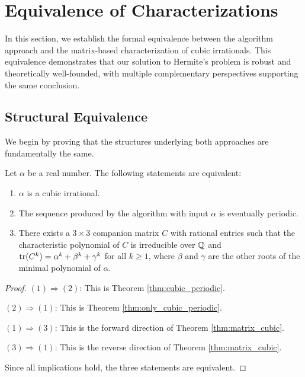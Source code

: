 \section{Equivalence of Characterizations}\label{sec:equivalence}

In this section, we establish the formal equivalence between the \HAPD{} algorithm approach and the matrix-based characterization of cubic irrationals. This equivalence demonstrates that our solution to Hermite's problem is robust and theoretically well-founded, with multiple complementary perspectives supporting the same conclusion.

\subsection{Structural Equivalence}

We begin by proving that the structures underlying both approaches are fundamentally the same.

\begin{theorem}\label{thm:structural_equivalence}
Let $\alpha$ be a real number. The following statements are equivalent:
\begin{enumerate}
    \item $\alpha$ is a cubic irrational.
    \item The sequence produced by the \HAPD{} algorithm with input $\alpha$ is eventually periodic.
    \item There exists a $3 \times 3$ companion matrix $C$ with rational entries such that the characteristic polynomial of $C$ is irreducible over $\mathbb{Q}$ and $\operatorname{tr}(C^k) = \alpha^k + \beta^k + \gamma^k$ for all $k \geq 1$, where $\beta$ and $\gamma$ are the other roots of the minimal polynomial of $\alpha$.
\end{enumerate}
\end{theorem}

\begin{proof}
$(1) \Rightarrow (2)$: This is Theorem \ref{thm:cubic_periodic}.

$(2) \Rightarrow (1)$: This is Theorem \ref{thm:only_cubic_periodic}.

$(1) \Rightarrow (3)$: This is the forward direction of Theorem \ref{thm:matrix_cubic}.

$(3) \Rightarrow (1)$: This is the reverse direction of Theorem \ref{thm:matrix_cubic}.

Since all implications hold, the three statements are equivalent.
\end{proof}

